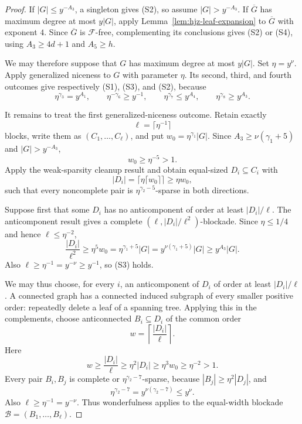 \documentclass[11pt]{article}
\numberwithin{equation}{section}
\theoremstyle{plain}
\theoremstyle{definition}
\begin{document}
\begin{proof}
If $|G|\leq y^{-A_3}$, a singleton gives (S2), so assume
$|G|>y^{-A_3}$.  If $\overline G$ has maximum degree at most
$y|G|$, apply Lemma~\ref{lem:hjz-leaf-expansion} to $\overline G$
with exponent $4$.  Since $\overline G$ is $\mathcal F$-free,
complementing its conclusions gives (S2) or (S4), using
$A_3\geq4d+1$ and $A_5\geq h$.

We may therefore suppose that $G$ has maximum degree at most $y|G|$.
Set $\eta=y^\nu$.  Apply generalized niceness to $G$ with parameter
$\eta$.  Its second, third, and fourth outcomes give respectively
(S1), (S3), and (S2), because
\[
 \eta^{\gamma_3}=y^{A_1},\qquad
 \eta^{-\gamma_6}\geq y^{-1},\qquad
 \eta^{\gamma_7}\leq y^{A_4},\qquad
 \eta^{\gamma_8}\geq y^{A_3}.
\]

It remains to treat the first generalized-niceness outcome.  Retain
exactly
\[
             \ell=\lceil\eta^{-1}\rceil
\]
blocks, write them as $(C_1,\ldots,C_\ell)$, and put
$w_0=\eta^{\gamma_1}|G|$.  Since
$A_3\geq\nu(\gamma_1+5)$ and $|G|>y^{-A_3}$,
\[
                  w_0\geq\eta^{-5}>1.
\]
Apply the weak-sparsity cleanup result and obtain equal-sized
$D_i\subseteq C_i$ with
\[
 |D_i|=\lceil\eta\lceil w_0\rceil\rceil\geq\eta w_0,
\]
such that every noncomplete pair is
$\eta^{\gamma_2-5}$-sparse in both directions.

Suppose first that some $D_i$ has no anticomponent of order at least
$|D_i|/\ell$.  The anticomponent result gives a complete
$(\ell,|D_i|/\ell^2)$-blockade.  Since $\eta\leq1/4$ and hence
$\ell\leq\eta^{-2}$,
\[
 \frac{|D_i|}{\ell^2}
   \geq\eta^5w_0
   =\eta^{\gamma_1+5}|G|
   =y^{\nu(\gamma_1+5)}|G|
   \geq y^{A_3}|G|.
\]
Also $\ell\geq\eta^{-1}=y^{-\nu}\geq y^{-1}$, so (S3) holds.

We may thus choose, for every $i$, an anticomponent of $D_i$ of order
at least $|D_i|/\ell$.  A connected graph has a connected induced
subgraph of every smaller positive order: repeatedly delete a leaf
of a spanning tree.  Applying this in the complements, choose
anticonnected $B_i\subseteq D_i$ of the common order
\[
                   w=\left\lceil\frac{|D_i|}{\ell}\right\rceil.
\]
Here
\[
 w\geq\frac{|D_i|}{\ell}
   \geq\eta^2|D_i|
   \geq\eta^3w_0
   \geq\eta^{-2}>1.
\]
Every pair $B_i,B_j$ is complete or
$\eta^{\gamma_2-7}$-sparse, because
$|B_j|\geq\eta^2|D_j|$, and
\[
 \eta^{\gamma_2-7}
       =y^{\nu(\gamma_2-7)}
       \leq y^\nu.
\]
Also $\ell\geq\eta^{-1}=y^{-\nu}$.  Thus wonderfulness applies to the
equal-width blockade
$\mathcal B=(B_1,\ldots,B_\ell)$.


\end{proof}
\end{document}
